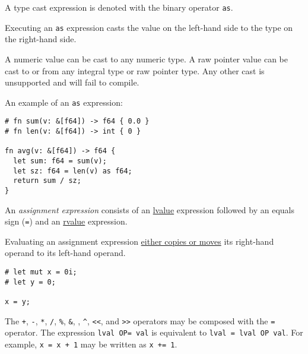 \documentclass[]{article}
\begin{document}

A type cast expression is denoted with the binary operator \texttt{as}.

Executing an \texttt{as} expression casts the value on the left-hand
side to the type on the right-hand side.

A numeric value can be cast to any numeric type. A raw pointer value can
be cast to or from any integral type or raw pointer type. Any other cast
is unsupported and will fail to compile.

An example of an \texttt{as} expression:

\begin{verbatim}
# fn sum(v: &[f64]) -> f64 { 0.0 }
# fn len(v: &[f64]) -> int { 0 }

fn avg(v: &[f64]) -> f64 {
  let sum: f64 = sum(v);
  let sz: f64 = len(v) as f64;
  return sum / sz;
}
\end{verbatim}


An \emph{assignment expression} consists of an
\hyperref[lvaluesux2c-rvalues-and-temporaries]{lvalue} expression
followed by an equals sign (\texttt{=}) and an
\hyperref[lvaluesux2c-rvalues-and-temporaries]{rvalue} expression.

Evaluating an assignment expression
\hyperref[moved-and-copied-types]{either copies or moves} its right-hand
operand to its left-hand operand.

\begin{verbatim}
# let mut x = 0i;
# let y = 0;

x = y;
\end{verbatim}


The \texttt{+}, \texttt{-}, \texttt{*}, \texttt{/}, \texttt{\%},
\texttt{\&}, \texttt{\textbar{}}, \texttt{\^{}},
\texttt{\textless{}\textless{}}, and
\texttt{\textgreater{}\textgreater{}} operators may be composed with the
\texttt{=} operator. The expression \texttt{lval OP= val} is equivalent
to \texttt{lval = lval OP val}. For example, \texttt{x = x + 1} may be
written as \texttt{x += 1}.
\end{document}
